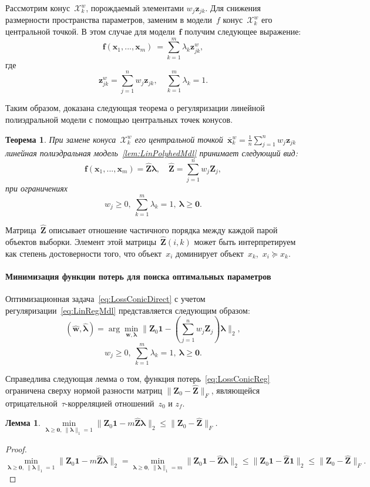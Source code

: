 \documentclass{elsarticle}
\newcommand{\bz}{\mathbf{z}}
\newcommand{\bx}{\mathbf{x}}
\newcommand{\bw}{\mathbf{w}}
\newcommand{\bfx}{\mathbf{f}}
\newcommand{\bZ}{\mathbf{Z}}
\newcommand{\blambda}{\boldsymbol{\lambda}}
\newcommand{\cX}{\mathcal{X}}
\newtheorem{theorem}{Теорема}%
\newtheorem{lemm}{Лемма}
\begin{document}
Рассмотрим конус~$\cX_k^w$, порождаемый элементами $w_j \bz_{jk}$. Для снижения размерности пространства параметров, заменим в модели~$f$ конус~$\cX_k^w$ его центральной точкой. В этом случае для модели~$\bfx$ получим следующее выражение:
\[
\bfx(\bx_1,...,\bx_m)~=\sum\limits_{k=1}^m \lambda_k \bz^w_{jk},
\]
где
\[
\bz^w_{jk}=\sum\limits_{j=1}^n w_j \bz_{jk},\quad\sum\limits_{k=1}^m\lambda_k=1.
\]

Таким образом, доказана следующая теорема о регуляризации линейной полиэдральной модели с помощью центральных точек конусов.
\begin{theorem}
При замене конуса~$\cX_k^w$ его центральной точкой~$\overline{\bx}_k^w=\frac{1}{n}\sum\limits_{j=1}^{n}w_j \bz_{jk}$ линейная полиэдральная модель~\eqref{lem:LinPolyhedMdl} принимает следующий вид:
\begin{equation}
\bfx(\bx_1,...,\bx_m)=\hat{\bZ}\blambda,\quad \hat{\bZ}=\sum\limits_{j=1}^nw_j\bZ_j,
\label{eq:LinRegMdl}
\end{equation}
при ограничениях
\[
w_j\geq 0,~\sum\limits_{k=1}^m\lambda_k=1,~\blambda\geq\mathbf{0}.
\]
\end{theorem}

Матрица~$\hat{\bZ}$ описывает отношение частичного порядка между каждой парой объектов выборки. Элемент этой матрицы~$\hat{\bZ}(i, k)$ может быть интерпретируем как степень достоверности того, что объект~$x_i$ доминирует объект~$x_k$,~$x_i\succeq x_k$.

\paragraph{Минимизация функции потерь для поиска оптимальных параметров} Оптимизационная задача~\eqref{eq:LossConicDirect} с учетом регуляризации~\eqref{eq:LinRegMdl} представляется следующим образом:
\begin{equation}
(\hat{\bw},\hat{\blambda})=\arg\min\limits_{\bw,\blambda}\|\bZ_0\mathbf{1}-\left(\sum\limits_{j=1}^nw_j\bZ_j\right)\blambda\|_2,
\label{eq:LossConicReg}
\end{equation}
\[
w_j\geq 0,~\sum\limits_{k=1}^m\lambda_k=1,~\blambda\geq\mathbf{0}.
\]

Справедлива следующая лемма о том, функция потерь~\eqref{eq:LossConicReg} ограничена сверху нормой разности матриц $\|\bZ_0-\hat{\bZ}\|_F$, являющейся отрицательной~$\tau$-корреляцией отношений~$z_0$ и $z_f$.
\begin{lemm}
$\min\limits_{\blambda\geq\mathbf{0},~\|\blambda\|_1=1}\|\bZ_0\mathbf{1}-m\hat{\bZ}\blambda\|_2\leq \|\bZ_0-\hat{\bZ}\|_F$.
\end{lemm}
\begin{proof}
\[
\min\limits_{\blambda\geq\mathbf{0},~\|\blambda\|_1=1}\|\bZ_0\mathbf{1}-m\hat{\bZ}\blambda\|_2=\min\limits_{\blambda\geq\mathbf{0},~\|\blambda\|_1=m}\|\bZ_0\mathbf{1}-\hat{\bZ}\blambda\|_2\leq\|\bZ_0\mathbf{1}-\hat{\bZ}\mathbf{1}\|_2\leq \|\bZ_0-\hat{\bZ}\|_F.
\]
\end{proof}
\end{document}

